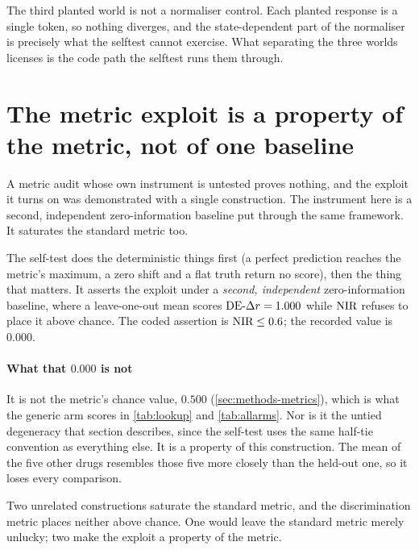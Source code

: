\begin{scopelimit}
The third planted world is not a normaliser control. Each planted response is a
single token, so nothing diverges, and the state-dependent part of the
normaliser is precisely what the selftest cannot exercise. What separating the
three worlds licenses is the code path the selftest runs them through.
\end{scopelimit}

\section{The metric exploit is a property of the metric, not of one baseline}
\label{sec:app-selftest}

\begin{question}
A metric audit whose own instrument is untested proves nothing, and the exploit
it turns on was demonstrated with a single construction. The instrument here is
a second, independent zero-information baseline put through the same framework.
It saturates the standard metric too.
\end{question}

\noindent
The self-test does the deterministic things first (a perfect prediction reaches
the metric's maximum, a zero shift and a flat truth return no score), then the
thing that matters. It asserts the exploit under a \emph{second, independent}
zero-information baseline, where a leave-one-out mean scores $\textrm{DE-}\Delta r = 1.000$
while $\textrm{NIR}$ refuses to place it above chance. The coded assertion is
$\textrm{NIR} \leq 0.6$; the recorded value is $0.000$.

\paragraph{What that $0.000$ is not} It is not the metric's chance value,
$0.500$ (\cref{sec:methods-metrics}), which is what the generic arm scores in
\cref{tab:lookup} and \cref{tab:allarms}. Nor is it the untied degeneracy that
section describes, since the self-test uses the same half-tie convention as
everything else. It is a property of this construction. The mean of the five
other drugs resembles those five more closely than the held-out one, so it loses
every comparison.

Two unrelated constructions saturate the standard metric, and the discrimination
metric places neither above chance. One would leave the standard metric merely
unlucky; two make the exploit a property of the metric.
